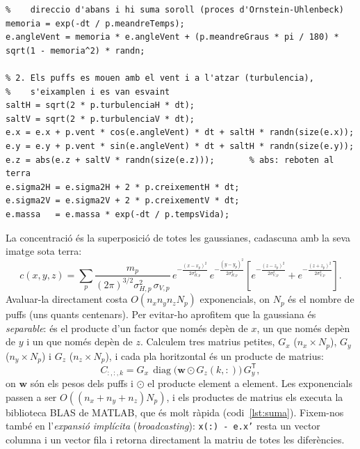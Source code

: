 \documentclass[11pt,a4paper]{article}
\begin{document}
\begin{lstlisting}[caption={Dinàmica dels puffs en un pas de temps (part de \texttt{Ploma.avancarPuffs}).}, label=lst:puffs]
% 1. La direccio del vent oscil.la a l'atzar: recorda una mica la
%    direccio d'abans i hi suma soroll (proces d'Ornstein-Uhlenbeck)
memoria = exp(-dt / p.meandreTemps);
e.angleVent = memoria * e.angleVent + (p.meandreGraus * pi / 180) * sqrt(1 - memoria^2) * randn;

% 2. Els puffs es mouen amb el vent i a l'atzar (turbulencia),
%    s'eixamplen i es van esvaint
saltH = sqrt(2 * p.turbulenciaH * dt);
saltV = sqrt(2 * p.turbulenciaV * dt);
e.x = e.x + p.vent * cos(e.angleVent) * dt + saltH * randn(size(e.x));
e.y = e.y + p.vent * sin(e.angleVent) * dt + saltH * randn(size(e.y));
e.z = abs(e.z + saltV * randn(size(e.z)));       % abs: reboten al terra
e.sigma2H = e.sigma2H + 2 * p.creixementH * dt;
e.sigma2V = e.sigma2V + 2 * p.creixementV * dt;
e.massa   = e.massa * exp(-dt / p.tempsVida);
\end{lstlisting}

La concentració és la superposició de totes les gaussianes, cadascuna amb la seva imatge sota terra:
\begin{equation}
c(x,y,z) = \sum_p \frac{m_p}{(2\pi)^{3/2}\sigma_{H,p}^2\,\sigma_{V,p}} \, e^{-\frac{(x-x_p)^2}{2\sigma_{H,p}^2}}\, e^{-\frac{(y-y_p)^2}{2\sigma_{H,p}^2}} \left[e^{-\frac{(z-z_p)^2}{2\sigma_{V,p}^2}} + e^{-\frac{(z+z_p)^2}{2\sigma_{V,p}^2}}\right].
\end{equation}
Avaluar-la directament costa $O(n_x n_y n_z N_p)$ exponencials, on $N_p$ és el nombre de puffs (uns quants centenars). Per evitar-ho aprofitem que la gaussiana és \emph{separable}: és el producte d'un factor que només depèn de $x$, un que només depèn de $y$ i un que només depèn de $z$. Calculem tres matrius petites, $G_x$ ($n_x \times N_p$), $G_y$ ($n_y \times N_p$) i $G_z$ ($n_z \times N_p$), i cada pla horitzontal és un producte de matrius:
\begin{equation}
C_{:,:,k} = G_x \,\operatorname{diag}\!\big(\mathbf{w} \odot G_z(k,:)\big)\, G_y^{\mathsf T},
\end{equation}
on $\mathbf{w}$ són els pesos dels puffs i $\odot$ el producte element a element. Les exponencials passen a ser $O((n_x+n_y+n_z)N_p)$, i els productes de matrius els executa la biblioteca BLAS de MATLAB, que és molt ràpida (codi~\ref{lst:suma}). Fixem-nos també en l'\emph{expansió implícita} (\emph{broadcasting}): \texttt{x(:) - e.x'} resta un vector columna i un vector fila i retorna directament la matriu de totes les diferències.
\end{document}
